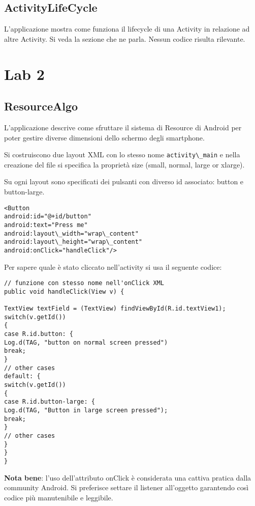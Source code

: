 \subsection{ActivityLifeCycle}
L'applicazione mostra come funziona il lifecycle di una Activity in relazione ad altre Activity. Si veda la sezione che ne parla. Nessun codice risulta rilevante.


\section{Lab 2}

\subsection{ResourceAlgo}
L'applicazione descrive come sfruttare il sistema di Resource di Android per poter gestire diverse dimensioni dello schermo degli smartphone.

Si costruiscono due layout XML con lo stesso nome \lstinline|activity\_main| e nella creazione del file si specifica la proprietà size (small, normal, large or xlarge).

Su ogni layout sono specificati dei pulsanti con diverso id associato: button e button-large.
\begin{lstlisting}
<Button
android:id="@+id/button"
android:text="Press me"
android:layout\_width="wrap\_content"
android:layout\_height="wrap\_content"
android:onClick="handleClick"/>
\end{lstlisting}

Per sapere quale è stato cliccato nell'activity si usa il seguente codice:
\begin{lstlisting}
// funzione con stesso nome nell'onClick XML
public void handleClick(View v) {

TextView textField = (TextView) findViewById(R.id.textView1);
switch(v.getId())
{
case R.id.button: {
Log.d(TAG, "button on normal screen pressed")
break;
}
// other cases
default: {
switch(v.getId())
{
case R.id.button-large: {
Log.d(TAG, "Button in large screen pressed");
break;
}
// other cases
}
}
}
\end{lstlisting}

\textbf{Nota bene}: l'uso dell'attributo onClick è considerata una cattiva pratica dalla community Android. Si preferisce settare il listener all'oggetto garantendo così codice più manutenibile e leggibile.


